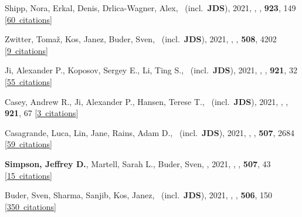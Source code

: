 \item[{\color{numcolor}\scriptsize67}] Shipp, Nora, Erkal, Denis, Drlica-Wagner, Alex, \etal\ (incl.\ \textbf{JDS}), 2021, , \apj, \textbf{923}, 149 [\href{https://ui.adsabs.harvard.edu/#abs/2021ApJ...923..149S}{60~citations}]

\item[{\color{numcolor}\scriptsize66}] Zwitter, Toma{\v{z}}, Kos, Janez, Buder, Sven, \etal\ (incl.\ \textbf{JDS}), 2021, , \mnras, \textbf{508}, 4202 [\href{https://ui.adsabs.harvard.edu/#abs/2021MNRAS.508.4202Z}{9~citations}]

\item[{\color{numcolor}\scriptsize65}] Ji, Alexander P., Koposov, Sergey E., Li, Ting S., \etal\ (incl.\ \textbf{JDS}), 2021, , \apj, \textbf{921}, 32 [\href{https://ui.adsabs.harvard.edu/#abs/2021ApJ...921...32J}{55~citations}]

\item[{\color{numcolor}\scriptsize64}] Casey, Andrew R., Ji, Alexander P., Hansen, Terese T., \etal\ (incl.\ \textbf{JDS}), 2021, , \apj, \textbf{921}, 67 [\href{https://ui.adsabs.harvard.edu/#abs/2021ApJ...921...67C}{3~citations}]

\item[{\color{numcolor}\scriptsize63}] Casagrande, Luca, Lin, Jane, Rains, Adam D., \etal\ (incl.\ \textbf{JDS}), 2021, , \mnras, \textbf{507}, 2684 [\href{https://ui.adsabs.harvard.edu/#abs/2021MNRAS.507.2684C}{59~citations}]

\item[{\color{numcolor}\scriptsize62}] \textbf{Simpson, Jeffrey D.}, Martell, Sarah L., Buder, Sven, \etal, 2021, , \mnras, \textbf{507}, 43 [\href{https://ui.adsabs.harvard.edu/#abs/2021MNRAS.507...43S}{15~citations}]

\item[{\color{numcolor}\scriptsize61}] Buder, Sven, Sharma, Sanjib, Kos, Janez, \etal\ (incl.\ \textbf{JDS}), 2021, , \mnras, \textbf{506}, 150 [\href{https://ui.adsabs.harvard.edu/#abs/2021MNRAS.506..150B}{350~citations}]

